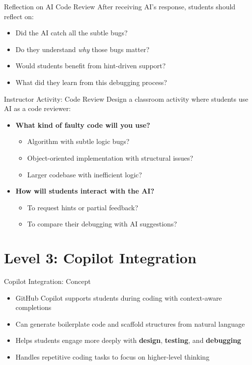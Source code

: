 \documentclass[xcolor={dvipsnames}, aspectratio=169]{beamer}
\begin{document}
\begin{frame}{Reflection on AI Code Review}
  After receiving AI's response, students should reflect on:
  \begin{itemize}
    \item Did the AI catch all the subtle bugs?
    \item Do they understand \textit{why} those bugs matter?
    \item Would students benefit from hint-driven support?
    \item What did they learn from this debugging process?
  \end{itemize}
\end{frame}

\begin{frame}{Instructor Activity: Code Review}
  Design a classroom activity where students use AI as a code reviewer:
  
  \begin{itemize}
    \item \textbf{What kind of faulty code will you use?}
      \begin{itemize}
        \item Algorithm with subtle logic bugs?
        \item Object-oriented implementation with structural issues?
        \item Larger codebase with inefficient logic?
      \end{itemize}
    \item \textbf{How will students interact with the AI?}
      \begin{itemize}
        \item To request hints or partial feedback?
        \item To compare their debugging with AI suggestions?
      \end{itemize}
  \end{itemize}
\end{frame}

\section{Level 3: Copilot Integration}

\begin{frame}{Copilot Integration: Concept}
  \begin{itemize}
    \item GitHub Copilot supports students during coding with context-aware completions
    \item Can generate boilerplate code and scaffold structures from natural language
    \item Helps students engage more deeply with \textbf{design}, \textbf{testing}, and \textbf{debugging}
    \item Handles repetitive coding tasks to focus on higher-level thinking
  \end{itemize}
\end{frame}
\end{document}
